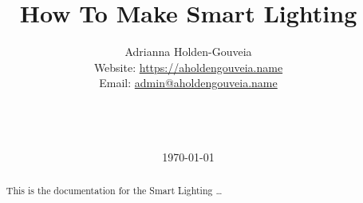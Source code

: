 \documentclass[12pt]{article}
\title{How To Make Smart Lighting}
\author{
        Adrianna Holden-Gouveia \\
        Website: \url{https://aholdengouveia.name}\\ 
        Email: \href{mailto:admin@aholdengouveia.name}{admin@aholdengouveia.name} \\
        \faLinkedin{: aholdengouveia} \\
        \faGithub {: aholdengouveia} \\
        \faTwitter {: aholdengouveia} \\
        }
\date{\today}
\begin{document}
    

\maketitle

\begin{abstract}
This is the documentation for the Smart Lighting \ldots
\end{abstract}
\tableofcontents




\end{document}
